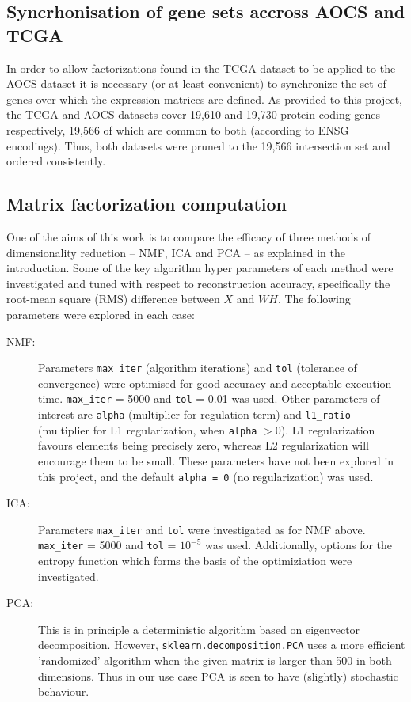 \documentclass[tikz, 12pt,a4paper,oneside,fleqn]{article}
\begin{document}
\subsection{Syncrhonisation of gene sets accross AOCS and TCGA}
\label{sec:gene-set-intersection}

In order to allow factorizations found in the TCGA dataset to be applied to the AOCS dataset it is necessary (or at least convenient) to synchronize the set of genes over which the expression matrices are defined.   As provided to this project, the TCGA and AOCS datasets cover 19,610 and 19,730 protein coding genes respectively, 19,566 of which are common to both (according to ENSG encodings).  Thus, both datasets were pruned to the 19,566 intersection set and ordered consistently.

\subsection{Matrix factorization computation}
One of the aims of this work is to compare the efficacy of three methods of dimensionality reduction -- NMF, ICA and PCA -- as explained in the introduction.     
Some of the key algorithm hyper parameters of each method were investigated and tuned with respect to reconstruction accuracy, specifically the root-mean square (RMS) difference between $X$ and $W H$. The following parameters were explored in each case:
\begin{description}
\item[NMF:] Parameters {\tt max\_iter} (algorithm iterations) and {\tt tol} (tolerance of convergence) were optimised for good accuracy and acceptable execution time.   
{\tt max\_iter} = 5000 and {\tt tol} = 0.01 was used.
Other parameters of interest are {\tt alpha} (multiplier for regulation term) and {\tt l1\_ratio} (multiplier for L1 regularization, when {\tt alpha} $> 0$).  L1 regularization  favours elements being precisely zero, whereas L2 regularization will encourage them to be small.  These parameters have not been explored in this project, and the default {\tt alpha = 0} (no regularization) was used.
\item[ICA:]  Parameters {\tt max\_iter} and {\tt tol} were investigated as for NMF above. 
{\tt max\_iter} = 5000 and {\tt tol} = $10^{-5}$ was used.
Additionally, options for the entropy function which forms the basis of the optimiziation were investigated.
\item[PCA:] This is in principle a deterministic algorithm based on eigenvector decomposition.  However, {\tt sklearn.decomposition.PCA} uses a more efficient 'randomized' algorithm when the given matrix is larger than 500 in both dimensions.  Thus in our use case PCA is seen to have (slightly) stochastic behaviour.
\end{description}
\end{document}
